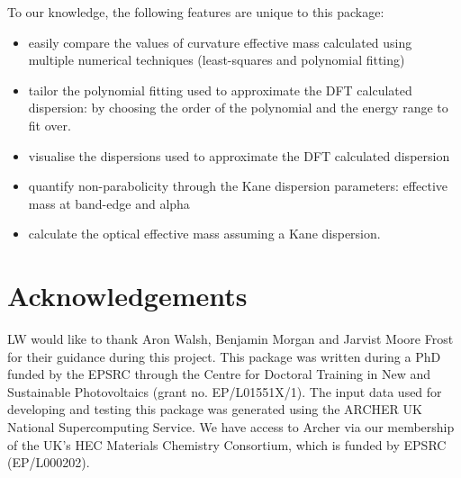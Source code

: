To our knowledge, the following features are unique to this package:
\begin{itemize}
    \item easily compare the values of curvature effective mass calculated using multiple numerical techniques (least-squares and polynomial fitting)
    \item tailor the polynomial fitting used to approximate the DFT calculated dispersion: by choosing the order of the polynomial and the energy range to fit over.
    \item visualise the dispersions used to approximate the DFT calculated dispersion
    \item quantify non-parabolicity through the Kane dispersion parameters: effective mass at band-edge and alpha
    \item calculate the optical effective mass assuming a Kane dispersion.
\end{itemize}

\section{Acknowledgements}
\label{sec:Acknowledgements}

LW would like to thank Aron Walsh, Benjamin Morgan and Jarvist Moore Frost for their guidance during this project. This package was written during a PhD funded by the EPSRC through the Centre for Doctoral Training in New and Sustainable Photovoltaics (grant no. EP/L01551X/1). The input data used for developing and testing this package was generated using the ARCHER UK National Supercomputing Service. We have access to Archer via our membership of the UK's HEC Materials Chemistry Consortium, which is funded by EPSRC (EP/L000202).


